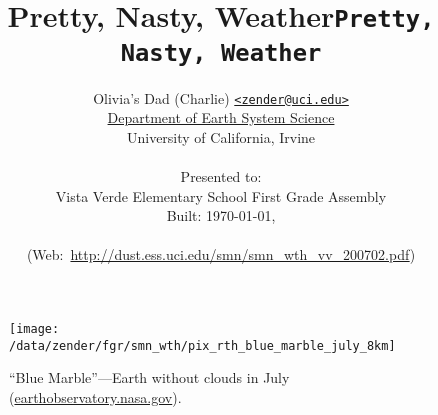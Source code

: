 \documentclass[12pt]{article}
\begin{document}

\def\smnttl{Pretty, Nasty, Weather}

\begin{screen}
\title{\color{section0}\Huge \smnttl} %
\end{screen}
\begin{print} 
\title{\Huge\texttt{\smnttl}} %
\end{print}

\author{\LARGE
Olivia's Dad (Charlie)
{\href{mailto:zender@uci.edu}{\color{section1}\texttt{<zender@uci.edu>}}}\\ 
\href{http://www.ess.uci.edu}{Department of Earth System Science}\\
University of California, Irvine\\
\\
Presented to:\\
Vista Verde Elementary School First Grade Assembly\\
Built: \shortdate\today, \xxivtime\\
\\
(Web:~\url{http://dust.ess.uci.edu/smn/smn_wth_vv_200702.pdf})
} %


\Large
\begin{figure*}
\centering\vspace{-0.25in}
\texttt{[image: /data/zender/fgr/smn\_wth/pix\_rth\_blue\_marble\_july\_8km]}%
\caption{
``Blue Marble''---Earth without clouds in July
(\href{http://earthobservatory.nasa.gov/Newsroom/BlueMarble/images_bmng/8km/world.topo.bathy.200407.3x5400x2700.jpg}{earthobservatory.nasa.gov}).
\label{fgr:pix_rth_blue_marble_july_8km}}
\end{figure*}
\clearpage

\date{} %
\maketitle
\begin{screen}
\vfill
\end{screen}
\clearpage
\end{document}
